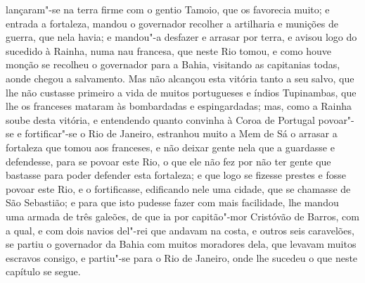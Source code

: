 \begin{linenumbers}
lançaram"-se na terra firme com o gentio Tamoio, que os favorecia muito; e entrada a
fortaleza, mandou o governador recolher a artilharia e munições de guerra, que nela havia;
e mandou"-a desfazer e arrasar por terra, e avisou logo do sucedido à Rainha, numa nau
francesa, que neste Rio tomou, e como houve monção se recolheu o governador para a Bahia,
visitando as capitanias todas, aonde chegou a salvamento. Mas não alcançou esta vitória
tanto a seu salvo, que lhe não custasse primeiro a vida de muitos portugueses e índios
Tupinambas, que lhe os franceses mataram às bombardadas e espingardadas; mas, como a
Rainha soube desta vitória, e entendendo quanto convinha à Coroa de Portugal povoar"-se e
fortificar"-se o Rio de Janeiro, estranhou muito a Mem de Sá o arrasar a fortaleza que
tomou aos franceses, e não deixar gente nela que a guardasse e defendesse, para se povoar
este Rio, o que ele não fez por não ter gente que bastasse para poder defender esta
fortaleza; e que logo se fizesse prestes e fosse povoar este Rio, e o fortificasse,
edificando nele uma cidade, que se chamasse de São Sebastião; e para que isto pudesse
fazer com mais facilidade, lhe mandou uma armada de três galeões, de que ia por
capitão"-mor Cristóvão de Barros, com a qual, e com dois navios del"-rei que andavam na
costa, e outros seis caravelões, se partiu o governador da Bahia com muitos moradores
dela, que levavam muitos escravos consigo, e partiu"-se para o Rio de Janeiro, onde lhe
sucedeu o que neste capítulo se segue.


\end{linenumbers}
